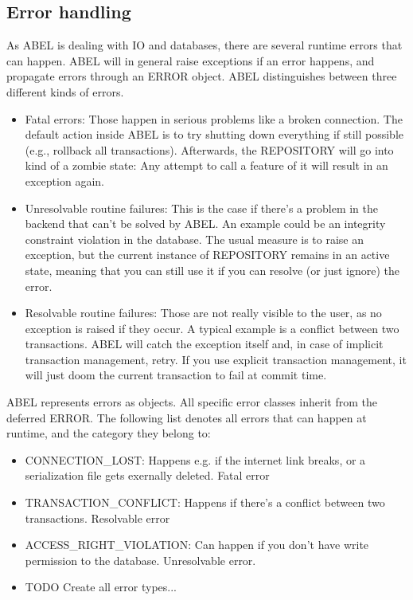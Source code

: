 \subsection{Error handling}

As ABEL is dealing with IO and databases, there are several runtime errors that can happen. 
ABEL will in general raise exceptions if an error happens, and propagate errors through an ERROR object.
ABEL distinguishes between three different kinds of errors.

\begin{itemize}
\item Fatal errors: Those happen in serious problems like a broken connection. 
The default action inside ABEL is to try shutting down everything if still possible (e.g., rollback all transactions). 
Afterwards, the REPOSITORY will go into kind of a zombie state: 
Any attempt to call a feature of it will result in an exception again.
\item Unresolvable routine failures: This is the case if there's a problem in the backend that can't be solved by ABEL.
An example could be an integrity constraint violation in the database. 
The usual measure is to raise an exception, but the current instance of REPOSITORY remains in an active state, meaning that you can still use it if you can resolve (or just ignore) the error.
\item Resolvable routine failures: Those are not really visible to the user, as no exception is raised if they occur.
A typical example is a conflict between two transactions.
ABEL will catch the exception itself and, in case of implicit transaction management, retry.
If you use explicit transaction management, it will just doom the current transaction to fail at commit time.
\end{itemize}

ABEL represents errors as objects. 
All specific error classes inherit from the deferred ERROR.
The following list denotes all errors that can happen at runtime, and the category they belong to:

\begin{itemize}
\item CONNECTION\_LOST: Happens e.g. if the internet link breaks, or a serialization file gets exernally deleted. Fatal error
\item TRANSACTION\_CONFLICT: Happens if there's a conflict between two transactions. Resolvable error
\item ACCESS\_RIGHT\_VIOLATION: Can happen if you don't have write permission to the database. Unresolvable error.
\item TODO Create all error types... 
\end{itemize}

